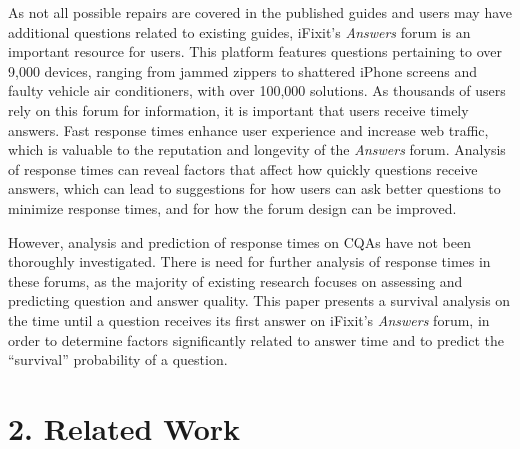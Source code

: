 \documentclass{article}
\begin{document}
As not all possible repairs are covered in the published guides and users may have additional questions related to existing guides, iFixit's \textit{Answers} forum is an important resource for users. This platform features questions pertaining to over 9,000 devices, ranging from jammed zippers to shattered iPhone screens and faulty vehicle air conditioners, with over 100,000 solutions. As thousands of users rely on this forum for information, it is important that users receive timely answers. Fast response times enhance user experience and increase web traffic, which is valuable to the reputation and longevity of the \textit{Answers} forum. Analysis of response times can reveal factors that affect how quickly questions receive answers, which can lead to suggestions for how users can ask better questions to minimize response times, and for how the forum design can be improved. 

However, analysis and prediction of response times on CQAs have not been thoroughly investigated. There is need for further analysis of response times in these forums, as the majority of existing research focuses on assessing and predicting question and answer quality. This paper presents a survival analysis on the time until a question receives its first answer on iFixit's \textit{Answers} forum, in order to determine factors significantly related to answer time and to predict the ``survival'' probability of a question.


\section*{2. Related Work}
  
\end{document}

